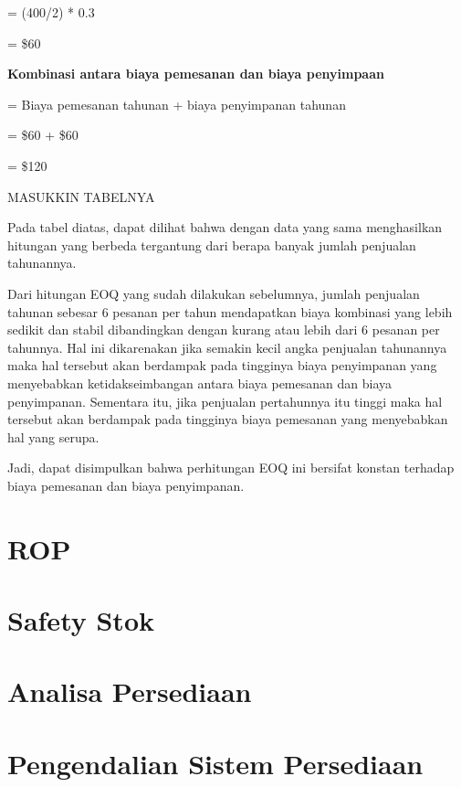 = (400/2) * 0.3

= \${60}

\textbf{Kombinasi antara biaya pemesanan dan biaya penyimpaan}

= Biaya pemesanan tahunan + biaya penyimpanan tahunan

= \${60} + \${60}

= \${120}

MASUKKIN TABELNYA

Pada tabel diatas, dapat dilihat bahwa dengan data yang sama menghasilkan hitungan yang berbeda tergantung dari berapa banyak jumlah penjualan tahunannya.

Dari hitungan EOQ yang sudah dilakukan sebelumnya, jumlah penjualan tahunan sebesar 6 pesanan per tahun mendapatkan biaya kombinasi yang lebih sedikit dan stabil dibandingkan dengan kurang atau lebih dari 6 pesanan per tahunnya. Hal ini dikarenakan jika semakin kecil angka penjualan tahunannya maka hal tersebut akan berdampak pada tingginya biaya penyimpanan yang menyebabkan ketidakseimbangan antara biaya pemesanan dan biaya penyimpanan. Sementara itu, jika penjualan pertahunnya itu tinggi maka hal tersebut akan berdampak pada tingginya biaya pemesanan yang menyebabkan hal yang serupa.

Jadi, dapat disimpulkan bahwa perhitungan EOQ ini bersifat konstan terhadap biaya pemesanan dan biaya penyimpanan.

\section{ROP}
\section{Safety Stok}
\section{Analisa Persediaan}
\section{Pengendalian Sistem Persediaan}

